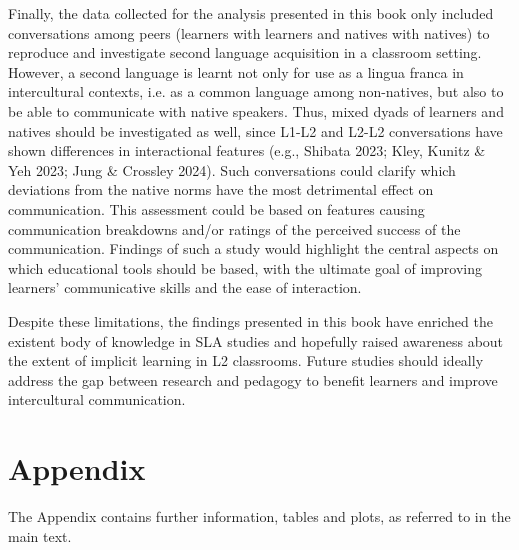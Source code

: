 \begin{stylecaption}
\textup{Finally, the data collected for the analysis presented in this book only included conversations among peers (learners with learners and natives with natives) to reproduce and investigate second language acquisition in a classroom setting. However, a second language is learnt not only for use as a lingua franca in intercultural contexts, i.e. as a common language among non-natives, but also to be able to communicate with native speakers. }\textup{Thus, mixed dyads of learners and natives should be investigated as well, since L1-L2 and L2-L2 conversations have shown differences in interactional features }\textup{(e.g., Shibata 2023; Kley, Kunitz \& Yeh 2023; Jung \& Crossley 2024)}\textup{. }\textup{Such conversations could clarify which deviations from the native norms have the most detrimental effect on communication. This assessment could be based on features causing communication breakdowns and/or ratings of the perceived success of the communication. Findings of such a study would highlight the central aspects on which educational tools should be based, with the ultimate goal of improving learners’ communicative skills and the ease of interaction.}
\end{stylecaption}

\begin{stylecaption}
\textup{Despite these limitations, the findings presented in this book have enriched the existent body of knowledge in SLA studies and hopefully raised awareness about the extent of implicit learning in L2 classrooms. Future studies should ideally address the gap between research and pedagogy to benefit learners and improve intercultural communication.}
\end{stylecaption}

\clearpage\section{Appendix}
\hypertarget{Toc191305967}{}\begin{styleStandard}
The Appendix contains further information, tables and plots, as referred to in the main text.
\end{styleStandard}

\begin{styleStandard}
  [Warning: Image ignored] %
 
\end{styleStandard}

